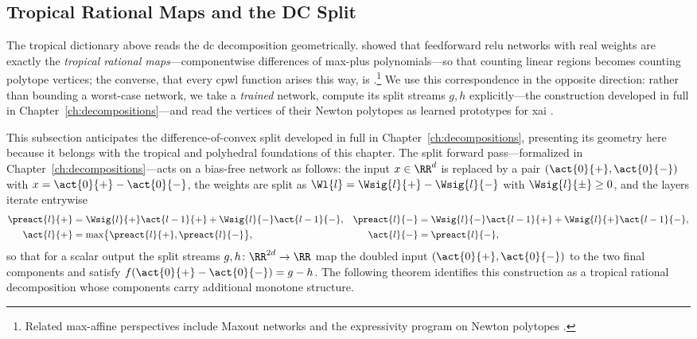 \subsection{Tropical Rational Maps and the DC Split}\label{sec:tropical_rational_maps}

The tropical dictionary above reads the \ac{dc} decomposition geometrically. \textcite{Zhang2018} showed that feedforward \ac{relu} networks with real weights are exactly the \emph{tropical rational maps}---componentwise differences of max-plus polynomials---so that counting linear regions becomes counting polytope vertices; the converse, that every \ac{cpwl} function arises this way, is \textcite{Arora2018}.\footnote{Related max-affine perspectives include Maxout networks \cite{Goodfellow2013Maxout} and the expressivity program on Newton polytopes \cite{Haase2023,Misiakos2022neural,hertrich2025neuralnetworksvirtualextended,huchette2025deeplearningmeetspolyhedral,Brandenburg2024b}.} We use this correspondence in the opposite direction: rather than bounding a worst-case network, we take a \emph{trained} network, compute its split streams $g, h$ explicitly---the construction developed in full in Chapter~\ref{ch:decompositions}---and read the vertices of their Newton polytopes as learned prototypes for \ac{xai} \cite{ZimmermannLoho2025}.

This subsection anticipates the difference-of-convex split developed in full in Chapter~\ref{ch:decompositions}, presenting its geometry here because it belongs with the tropical and polyhedral foundations of this chapter. The split forward pass---formalized in Chapter~\ref{ch:decompositions}---acts on a bias-free network as follows: the input $x \in \RR^d$ is replaced by a pair $(\act{0}{+}, \act{0}{-})$ with $x = \act{0}{+} - \act{0}{-}$, the weights are split as $\Wl{l} = \Wsig{l}{+} - \Wsig{l}{-}$ with $\Wsig{l}{\pm} \ge 0$, and the layers iterate entrywise
\begin{align}
    \preact{l}{+} &= \Wsig{l}{+} \act{l-1}{+} + \Wsig{l}{-} \act{l-1}{-},
    &
    \preact{l}{-} &= \Wsig{l}{-} \act{l-1}{+} + \Wsig{l}{+} \act{l-1}{-},
    \label{eq:split_preact_recursion}
    \\
    \act{l}{+} &= \max\bigl\{ \preact{l}{+}, \preact{l}{-} \bigr\},
    &
    \act{l}{-} &= \preact{l}{-},
    \label{eq:split_act_recursion}
\end{align}
so that for a scalar output the split streams $g, h \colon \RR^{2d} \to \RR$ map the doubled input $(\act{0}{+}, \act{0}{-})$ to the two final components and satisfy $f(\act{0}{+} - \act{0}{-}) = g - h$. The following theorem identifies this construction as a tropical rational decomposition whose components carry additional monotone structure.

